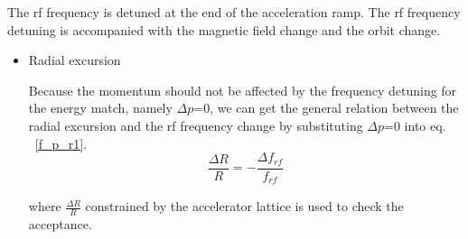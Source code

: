 The rf frequency is detuned at the end of the acceleration ramp. The rf frequency detuning is accompanied with the magnetic field  change and the orbit change.

\begin {itemize}
\item Radial excursion

Because the momentum should not be affected by the frequency detuning for the energy match, namely $\Delta p$=0, we can get the general relation between the radial excursion and the rf frequency change by substituting $\Delta p$=0 into eq. ~\ref{f_p_r1}.
\begin{equation}
\frac{\Delta{R}}{R}= - \frac{\Delta f_{\mathit{rf}}}{f_{\mathit{rf}}} 
\label{eq:eq4}
\end{equation}

where $\frac{\Delta{R}}{R}$ constrained by the accelerator lattice is used to check the acceptance.

%
%
%
%
\end {itemize}

